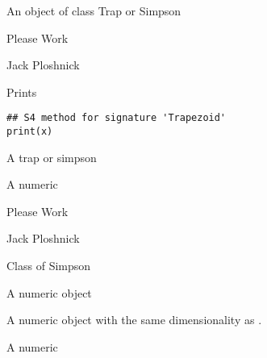 \documentclass[a4paper]{book}
\begin{document}
%
\begin{Value}
An object of class Trap or Simpson
\end{Value}
%
\begin{Note}\relax
Please Work
\end{Note}
%
\begin{Author}\relax
Jack Ploshnick
\end{Author}
%
\begin{SeeAlso}\relax
{}
\end{SeeAlso}
%
\begin{Description}\relax
Prints
\end{Description}
%
\begin{Usage}
\begin{verbatim}
## S4 method for signature 'Trapezoid'
print(x)
\end{verbatim}
\end{Usage}
%
\begin{Arguments}
\begin{ldescription}
\item[\code{x}] A trap or simpson
\end{ldescription}
\end{Arguments}
%
\begin{Value}
A numeric
\end{Value}
%
\begin{Note}\relax
Please Work
\end{Note}
%
\begin{Author}\relax
Jack Ploshnick
\end{Author}
%
\begin{SeeAlso}\relax
{}
\end{SeeAlso}
%
\begin{Description}\relax
Class of Simpson
\end{Description}
%
\begin{Arguments}
\begin{ldescription}
\item[\code{x}] A numeric object

\item[\code{y}] A numeric object with the same dimensionality as .

\item[\code{estimate}] A numeric
\end{ldescription}
\end{Arguments}
\end{document}

